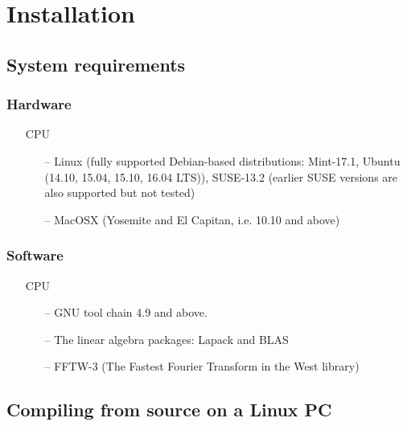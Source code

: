 \documentclass[a4paper,11pt]{article}
\begin{document}
\section{Installation}
\label{install}

\subsection{System requirements}
\label{sysreq}

\subsubsection{Hardware}
\label{hardware}

\begin{itemize}
	\item [CPU]
	\begin{itemize}
		\item[--] Linux (fully supported Debian-based distributions: Mint-17.1, Ubuntu (14.10, 15.04, 15.10, 16.04 LTS)), SUSE-13.2 (earlier SUSE versions are also supported but not tested)
		\item[--] MacOSX (Yosemite and El Capitan, i.e. 10.10 and above)
	\end{itemize}
\end{itemize}

\subsubsection{Software}
\label{soft}

\begin{itemize}
	\item [CPU]
	\begin{itemize}
		\item[--] GNU tool chain 4.9 and above.
		\item[--] The linear algebra packages: Lapack and BLAS
		\item[--] FFTW-3 (The Fastest Fourier Transform in the West library)
	\end{itemize}
\end{itemize}


\subsection{Compiling from source on a Linux PC}
\label{compilepc}
\end{document}
